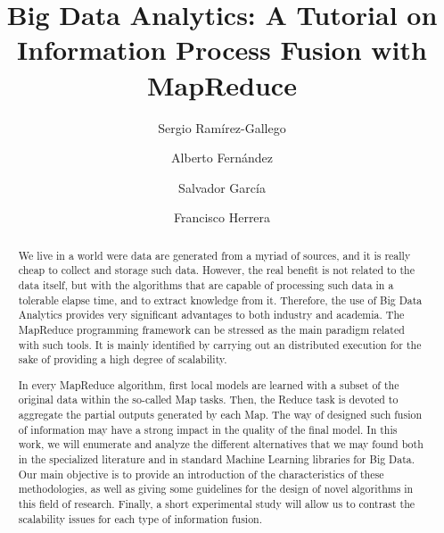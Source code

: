 \documentclass[3p,review]{elsarticle}
\begin{document}
\begin{frontmatter}

\title{Big Data Analytics: A Tutorial on Information Process Fusion with MapReduce}

\author[grx]{Sergio Ram\'irez-Gallego}

\author[grx]{Alberto Fern\'andez}

\author[grx]{Salvador Garc\'ia}

\author[grx]{Francisco Herrera}

\address[grx]{Department of Computer Science and Artificial Intelligence, University of Granada, Granada, Spain}



\begin{abstract}

We live in a world were data are generated from a myriad of sources, and it is really cheap to collect and storage such data. However, the real benefit is not related to the data itself, but with the algorithms that are capable of processing such data in a tolerable elapse time, and to extract knowledge from it. Therefore, the use of Big Data Analytics provides very significant advantages to both industry and academia. The MapReduce programming framework can be stressed as the main paradigm related with such tools. It is mainly identified by carrying out an distributed execution for the sake of providing a high degree of scalability. 

In every MapReduce algorithm, first local models are learned with a subset of the original data within the so-called Map tasks. Then, the Reduce task is devoted to aggregate the partial outputs generated by each Map. The way of designed such fusion of information may have a strong impact in the quality of the final model. In this work, we will enumerate and analyze the different alternatives that we may found both in the specialized literature and in standard Machine Learning libraries for Big Data. Our main objective is to provide an introduction of the characteristics of these methodologies, as well as giving some guidelines for the design of novel algorithms in this field of research.  Finally, a short experimental study will allow us to contrast the scalability issues for each type of information fusion.


\end{abstract}
\end{frontmatter}
\end{document}
